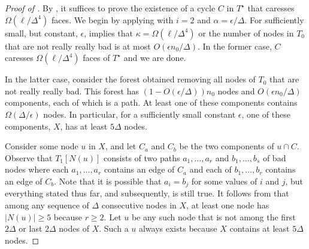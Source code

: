 \documentclass{patmorin}
\newcommand{\dual}[1]{{#1}^\star}
\begin{document}
\begin{proof}[Proof of ]
By , it suffices to prove the existence of
a cycle $C$ in $\dual{T}$ that caresses $\Omega(\ell/\Delta^4)$
faces.  We begin by applying  with
$i=2$ and $\alpha = \epsilon/\Delta$.  For sufficiently small, but constant,
$\epsilon$,  implies that $\kappa =
\Omega(\ell/\Delta^4)$ or the number of nodes in $T_0$ that are not really
really bad is at most $O(\epsilon n_0/\Delta)$.  In the former case,
$C$ caresses $\Omega(\ell/\Delta^4)$ faces of $\dual{T}$ and we are done.

In the latter case, consider the forest obtained removing
all nodes of $T_0$ that are not really really bad.  This forest has
$(1-O(\epsilon/\Delta))n_0$ nodes and $O(\epsilon n_0/\Delta)$ components,
each of which is a path.  At least one of these components contains
$\Omega(\Delta/\epsilon)$ nodes. In particular, for a sufficiently
small constant $\epsilon$, one of these components, $X$, has at least
$5\Delta$ nodes.


Consider some node $u$ in $X$, and let $C_a$ and $C_b$ be the
two components of $u\cap C$. Observe that $T_1[N(u)]$ consists
of two paths $a_1,\ldots,a_r$ and $b_1,\ldots,b_s$ of bad nodes
where each $a_1,\ldots,a_r$ contains an edge of $C_a$ and each of
$b_1,\ldots,b_r$ contains an edge of $C_b$. Note that it is
possible that $a_i=b_j$ for some values of $i$ and $j$, but everything
stated thus far, and subsequently, is still true. It follows from
 that among any sequence of $\Delta$
consecutive nodes in $X$, at least one node has $|N(u)|\ge 5$ because
$r\ge 2$.  Let $u$ be any such node that is not among the first $2\Delta$
or last $2\Delta$ nodes of $X$.  Such a $u$ always exists because $X$
contains at least $5\Delta$ nodes.


\end{proof}
\end{document}
